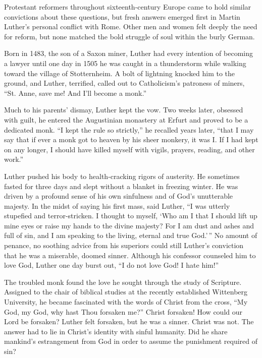 Protestant reformers throughout sixteenth-century Europe came to hold similar convictions about
these questions, but fresh answers emerged first in Martin Luther’s personal conflict with Rome.
Other men and women felt deeply the need for reform, but none matched the bold struggle of soul
within the burly German.

Born in 1483, the son of a Saxon miner, Luther had every intention of becoming a lawyer until one
day in 1505 he was caught in a thunderstorm while walking toward the village of Stotternheim. A bolt
of lightning knocked him to the ground, and Luther, terrified, called out to Catholicism’s patroness
of miners, “St. Anne, save me! And I’ll become a monk.”

Much to his parents’ dismay, Luther kept the vow. Two weeks later, obsessed with guilt, he entered
the Augustinian monastery at Erfurt and proved to be a dedicated monk. “I kept the rule so
strictly,” he recalled years later, “that I may say that if ever a monk got to heaven by his sheer
monkery, it was I. If I had kept on any longer, I should have killed myself with vigils, prayers,
reading, and other work.”

Luther pushed his body to health-cracking rigors of austerity. He sometimes fasted for three days
and slept without a blanket in freezing winter. He was driven by a profound sense of his own
sinfulness and of God’s unutterable majesty. In the midst of saying his first mass, said Luther, “I
was utterly stupefied and terror-stricken. I thought to myself, ‘Who am I that I should lift up mine
eyes or raise my hands to the divine majesty? For I am dust and ashes and full of sin, and I am
speaking to the living, eternal and true God.’\,” No amount of penance, no soothing advice from his
superiors could still Luther’s conviction that he was a miserable, doomed sinner. Although his
confessor counseled him to love God, Luther one day burst out, “I do not love God! I hate him!”

The troubled monk found the love he sought through the study of Scripture. Assigned to the chair of
biblical studies at the recently established Wittenberg University, he became fascinated with the
words of Christ from the cross, “My God, my God, why hast Thou forsaken me?” Christ forsaken! How
could our Lord be forsaken? Luther felt forsaken, but he was a sinner. Christ was not. The answer
had to lie in Christ’s identity with sinful humanity. Did he share mankind’s estrangement from God
in order to assume the punishment required of sin?

